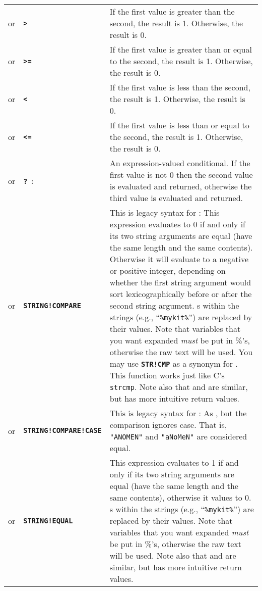 \documentclass{article}
\def\ttref#1{\ahrefloc{#1}{\tt #1}}
\def\DEFINE#1{{\tt \bf #1}\label{#1}\index{#1}}
\def\DEFSYN#1{{\tt \bf #1}\index{#1}}
\def\t#1{{\tt #1}}
\begin{document}
\begin{tabular}{cp{10in}|p{10in}}
or & \ttref{value} \DEFSYN{>} \ttref{value} & If the first value is
greater than the second, the result is 1. Otherwise, the result is 0. \\
or & \ttref{value} \DEFSYN{>=} \ttref{value} & If the first value is
greater than or equal to the second, the result is 1. Otherwise, the result
is 0. \\
or & \ttref{value} \DEFSYN{<} \ttref{value} & If the first value is
less than the second, the result is 1. Otherwise, the result
is 0. \\
or & \ttref{value} \DEFSYN{<=} \ttref{value} & If the first value is
less than or equal to the second, the result is 1. Otherwise, the result
is 0. \\
or & \ttref{value} \DEFSYN{?} \ttref{value} \t{:} \ttref{value} &
An expression-valued conditional.  If the first value is not 0 then the
second value is evaluated and returned, otherwise the third value is
evaluated and returned.  \\

or & \ttref{String} \DEFINE{STRING!COMPARE} \ttref{String} &
This is legacy syntax for \ttref{STRING!EQUAL}:
This expression evaluates to 0 if and only if its two string arguments are
equal (have the same length and the same contents). Otherwise it will evaluate
to a negative or positive integer, depending on whether the first string argument
would sort lexicographically before or after the second string argument.
\ttref{variable}s within the strings (e.g., ``\t{\%mykit\%}'') are replaced by
their values. Note that variables that you want expanded \emph{must} be put in \%'s,
otherwise the raw text will be used.
You may use \DEFINE{STR!CMP} as a synonym for \ttref{STRING!COMPARE}. This
function works just like C's \t{strcmp}.
Note also that \ttref{STRING!EQUAL} and \ttref{STRING!COMPARE} are similar,
but \ttref{STRING!EQUAL} has more intuitive return values. \\

or & \ttref{String} \DEFINE{STRING!COMPARE!CASE} \ttref{String} &
This is legacy syntax for \ttref{STRING!EQUAL!CASE}:
As \ttref{STRING!COMPARE}, but the comparison ignores case. That is,
\t{"ANOMEN"} and \t{"aNoMeN"} are considered equal.\\

or & \ttref{String} \DEFINE{STRING!EQUAL} \ttref{String} &
This expression evaluates to 1 if and only if its two string arguments are
equal (have the same length and the same contents), otherwise it values to 0.
\ttref{variable}s within the strings (e.g., ``\t{\%mykit\%}'') are replaced
by their values.
Note that variables that you want expanded \emph{must} be put in \%'s,
otherwise the raw text will be used.
Note also that \ttref{STRING!EQUAL} and \ttref{STRING!COMPARE} are similar,
but \ttref{STRING!EQUAL} has more intuitive return values. \\


\end{tabular}
\end{document}
